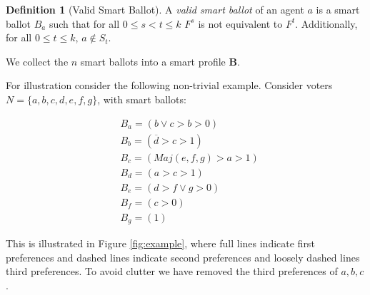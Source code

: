 \documentclass[11pt,a4paper, titlepage]{article}
\theoremstyle{definition}
\newtheorem{definition}[theorem]{Definition}
\newcommand{\Maj}{\mathit{Maj}}
\begin{document}
\begin{definition}[Valid Smart Ballot]
    A \emph{valid smart ballot} of an agent $a$ is a smart ballot $B_a$ such that for all $ 0 \leq s < t \leq k$ $F^s$ is not equivalent to $F^t$. Additionally, for all $0 \leq t \leq k$, $a \notin S_t$.
\end{definition}


We collect the $n$ smart ballots into a smart profile $\mathbf{B}$. 

For illustration consider the following non-trivial example.
Consider voters $N = \{a, b, c, d, e, f, g\}$, with smart ballots:

\begin{align*}
    &B_a =(b \lor c > b > 0) \\
    &B_b = \left(\overline{d} > c > 1 \right) \\
    &B_c = \left(\Maj(e, f, g) > a > 1 \right) \\
    &B_d = (a > c > 1) \\
    &B_e = (d > f \lor g > 0) \\
    &B_f = (c > 0) \\
    &B_g = (1)
\end{align*}

This is illustrated in Figure \ref{fig:example}, where full lines indicate first preferences and dashed lines indicate second preferences and loosely dashed lines third preferences. To avoid clutter we have removed the third preferences of $a, b, c$.
\end{document}

